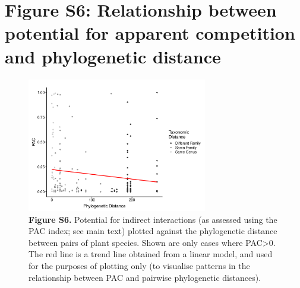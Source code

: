 \documentclass[11pt]{article}
\begin{document}
\newpage


\section{ Figure S6: Relationship between potential for apparent competition and phylogenetic distance}


\begin{figure}[H]
\caption[]{\textbf{Figure S6.} Potential for indirect interactions (as assessed using the PAC index; see main text) plotted against the phylogenetic distance between pairs of plant species. Shown are only cases where PAC>0. The red line is a trend line obtained from a linear model, and used for the purposes of plotting only (to visualise patterns in the relationship between PAC and pairwise phylogenetic distances).}
\centering\includegraphics[width=0.7\textwidth]{../Figures/FigureS6.pdf} 
\end{figure}
\end{document}
